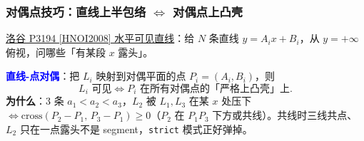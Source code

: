		\subsubsection{对偶点技巧：直线上半包络 $\Leftrightarrow$ 对偶点上凸壳}

		\href{https://www.luogu.com.cn/problem/P3194}{洛谷 P3194 [HNOI2008] 水平可见直线}：给 $N$ 条直线 $y = A_i x + B_i$，从 $y = +\infty$ 俯视，问哪些「有某段 $x$ 露头」。

		\textcolor{blue}{\textbf{直线-点对偶}}：把 $L_i$ 映射到对偶平面的点 $P_i = (A_i, B_i)$，则
		\[
			L_i \text{ 可见} \iff P_i \text{ 在所有对偶点的「严格上凸壳」上.}
		\]
		\textbf{为什么}：3 条 $a_1 < a_2 < a_3$，$L_2$ 被 $L_1, L_3$ 在某 $x$ 处压下 $\iff \mathrm{cross}(P_2 - P_1,\, P_3 - P_1) \ge 0$（$P_2$ 在 $P_1 P_3$ 下方或共线）。共线时三线共点、$L_2$ 只在一点露头不是 segment，\texttt{strict} 模式正好弹掉。

